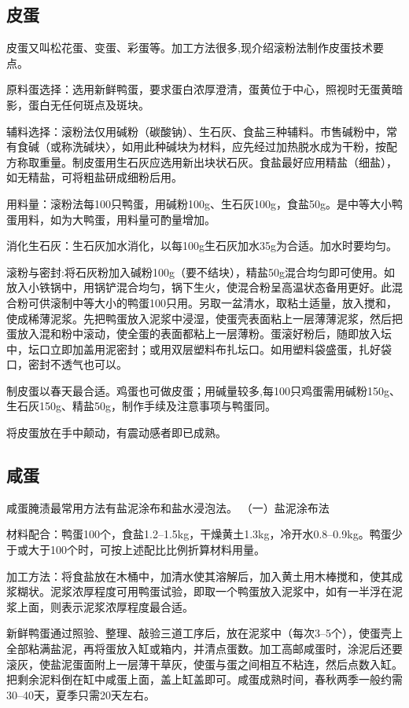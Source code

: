 \documentclass{ctexbook}
\begin{document}
\subsection{皮蛋}
皮蛋又叫松花蛋、变蛋、彩蛋等。加工方法很多,现介绍滚粉法制作皮蛋技术要点。

原料蛋选择：选用新鲜鸭蛋，要求蛋白浓厚澄清，蛋黄位于中心，照视时无蛋黄暗影，蛋白无任何斑点及斑块。

辅料选择：滚粉法仅用碱粉（碳酸钠）、生石灰、食盐三种辅料。市售碱粉中，常有食碱（或称洗碱块〉，如用此种碱块为材料，应先经过加热脱水成为干粉，按配方称取重量。制皮蛋用生石灰应选用新出块状石灰。食盐最好应用精盐（细盐），如无精盐，可将粗盐研成细粉后用。

用料量：滚粉法每100只鸭蛋，用碱粉100g、生石灰100g，食盐50g。是中等大小鸭蛋用料，如为大鸭蛋，用料量可酌量增加。

消化生石灰：生石灰加水消化，以每100g生石灰加水35g为合适。加水时要均匀。

滚粉与密封:将石灰粉加入碱粉100g（要不结块），精盐50g混合均匀即可使用。如放入小铁锅中，用锅铲混合均匀，锅下生火，使混合粉呈高温状态备用更好。此混合粉可供滚制中等大小的鸭蛋100只用。另取一盆清水，取粘土适量，放入搅和，使成稀薄泥浆。先把鸭蛋放入泥浆中浸湿，使蛋壳表面粘上一层薄薄泥浆，然后把蛋放入混和粉中滚动，使全蛋的表面都粘上一层薄粉。蛋滚好粉后，随即放入坛中，坛口立即加盖用泥密封；或用双层塑料布扎坛口。如用塑料袋盛蛋，扎好袋口，密封不透气也可以。

制皮蛋以春天最合适。鸡蛋也可做皮蛋；用碱量较多,每100只鸡蛋需用碱粉150g、生石灰150g、精盐50g，制作手续及注意事项与鸭蛋同。

将皮蛋放在手中颠动，有震动感者即已成熟。

\subsection{咸蛋}
咸蛋腌渍最常用方法有盐泥涂布和盐水浸泡法。
（一）盐泥涂布法

材料配合：鸭蛋100个，食盐1.2--1.5kg，干燥黄土1.3kg，冷开水0.8--0.9kg。鸭蛋少于或大于100个时，可按上述配比比例折算材料用量。

加工方法：将食盐放在木桶中，加清水使其溶解后，加入黄土用木棒搅和，使其成浆糊状。泥浆浓厚程度可用鸭蛋试验，即取一个鸭蛋放入泥浆中，如有一半浮在泥浆上面，则表示泥浆浓厚程度最合适。

新鲜鸭蛋通过照验、整理、敲验三道工序后，放在泥浆中（每次3--5个），使蛋壳上全部粘满盐泥，再将蛋放入缸或箱内，并清点蛋数。加工高邮咸蛋时，涂泥后还要滚灰，使盐泥蛋面附上一层薄干草灰，使蛋与蛋之间相互不粘连，然后点数入缸。把剩余泥料倒在缸中咸蛋上面，盖上缸盖即可。咸蛋成熟时间，春秋两季一般约需30--40天，夏季只需20天左右。
\end{document}
